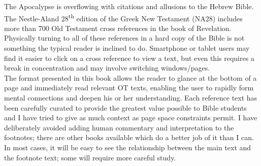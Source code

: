 The Apocalypse is overflowing with citations and allusions to the Hebrew Bible. The Nestle-Aland 28\textsuperscript{th} edition of the Greek New Testament (\textsc{NA28}) includes more than 700 Old Testament cross references in the book of Revelation. Physically turning to all of these references in a hard copy of the Bible is not something the typical reader is inclined to do. Smartphone or tablet users may find it easier to click on a cross reference to view a text, but even this requires a break in concentration and may involve switching windows/pages. \\

The format presented in this book allows the reader to glance at the bottom of a page and immediately read relevant OT texts, enabling the user to rapidly form mental connections and deepen his or her understanding. Each reference text has been carefully curated to provide the greatest value possible to Bible students and I have tried to give as much context as page space constraints permit. I have deliberately avoided adding human commentary and interpretation to the footnotes; there are other books available which do a better job of it than I can. In most cases, it will be easy to see the relationship between the main text and the footnote text; some will require more careful study.\\

